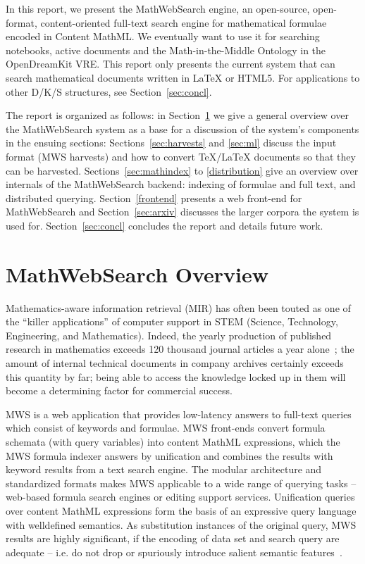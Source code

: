 \documentclass{deliverablereport}
\def\pn{OpenDreamKit\xspace}
\begin{document}
In this report, we present the MathWebSearch engine, an open-source, open-format,
content-oriented full-text search engine for mathematical formulae encoded in Content
MathML. We eventually want to use it for searching notebooks, active documents and the
Math-in-the-Middle Ontology in the \pn VRE. This report only presents the current system
that can search mathematical documents written in {\LaTeX} or HTML5. For applications to
other D/K/S structures, see Section~\ref{sec:concl}.
 
The report is organized as follows: in Section~\ref{sec:mws} we give a general overview
over the MathWebSearch system as a base for a discussion of the system's components in the
ensuing sections: Sections~\ref{sec:harvests} and \ref{sec:ml} discuss the input format
(MWS harvests) and how to convert {\TeX/\LaTeX} documents so that they can be
harvested. Sections~\ref{sec:mathindex} to \ref{distribution} give an overview over
internals of the MathWebSearch backend: indexing of formulae and full text, and
distributed querying. Section~\ref{frontend} presents a web front-end for MathWebSearch
and Section~\ref{sec:arxiv} discusses the larger corpora the system is used for.
Section~\ref{sec:concl} concludes the report and details future work.

\section{MathWebSearch Overview}\label{sec:mws}

Mathematics-aware information retrieval (MIR) has often been touted as one of the “killer
applications” of computer support in STEM (Science, Technology, Engineering, and
Mathematics). Indeed, the yearly production of published research in mathematics exceeds
120 thousand journal articles a year alone~\cite{KohProHam:ntcir11}; the amount of
internal technical documents in company archives certainly exceeds this quantity by far;
being able to access the knowledge locked up in them will become a determining factor for
commercial success.

MWS is a web application that provides low-latency answers to full-text queries which
consist of keywords and formulae. MWS front-ends convert formula schemata (with query
variables) into content MathML expressions, which the MWS formula indexer answers by
unification and combines the results with keyword results from a text search engine. The
modular architecture and standardized formats makes MWS applicable to a wide range of
querying tasks – web-based formula search engines or editing support services. Unification
queries over content MathML expressions form the basis of an expressive query language
with welldefined semantics. As substitution instances of the original query, MWS results
are highly significant, if the encoding of data set and search query are adequate –
i.e. do not drop or spuriously introduce salient semantic
features~\cite{KohProHam:ntcir11}.
\end{document}
